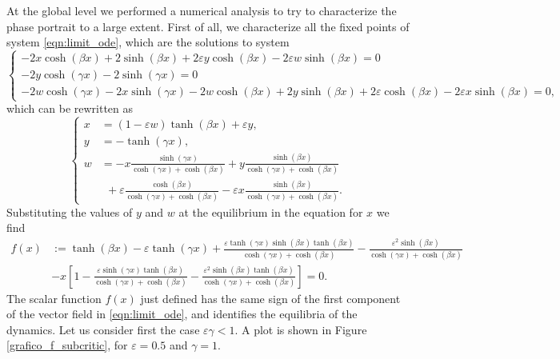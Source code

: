 \documentclass[a4paper,10pt,leqno]{amsart}
\theoremstyle{plain}
\begin{document}
At the global level we performed a numerical analysis to try to characterize the phase portrait to a large extent.
First of all, we characterize all the fixed points of system \eqref{eqn:limit_ode}, which are the solutions to system
\begin{equation}
\label{eqn:fixed_p}
\begin{cases}
- 2 x \cosh{(\beta x)} + 2 \sinh{(\beta x)} + 2\varepsilon y \cosh{(\beta x)} - 2\varepsilon w \sinh{(\beta x)} = 0 \\
-2 y \cosh{(\gamma x)} - 2\sinh{(\gamma x)} = 0\\
- 2 w \cosh{(\gamma x)} - 2 x \sinh{(\gamma x)} - 2w\cosh{(\beta x)} + 2y\sinh{(\beta x)}+ 2\varepsilon\cosh{(\beta x)} - 2\varepsilon x \sinh{(\beta x)} = 0,
\end{cases}
\end{equation}
which can be rewritten as
\begin{equation}
\label{eqn:rel}
\begin{cases}
x  &= (1-\varepsilon w)\tanh{(\beta x)} + \varepsilon y,\\
y  &= -\tanh{(\gamma x)},\\
w &= - x \frac{\sinh{(\gamma x)}}{\cosh{(\gamma x)} + \cosh{(\beta x)}} + y \frac{\sinh{(\beta x)}}{\cosh{(\gamma x)} + \cosh{(\beta x)}}\\
& \ \ + \varepsilon \frac{\cosh{(\beta x)}}{\cosh{(\gamma x)} + \cosh{(\beta x)}} - \varepsilon x \frac{\sinh{(\beta x)}}{\cosh{(\gamma x)} + \cosh{(\beta x)}}.
\end{cases}
\end{equation}
Substituting the values of $y$ and $w$ at the equilibrium in the equation for $x$ we find 
\begin{align}
\label{eqn:scalar}
f(x) & := \tanh{(\beta x)} - \varepsilon \tanh{(\gamma x)} + \frac{\varepsilon \tanh{(\gamma x)} \sinh{(\beta x)} \tanh{(\beta x)}}{\cosh{(\gamma x)} + \cosh{(\beta x)}} - \frac{\varepsilon^2 \sinh{(\beta x)}}{\cosh{(\gamma x)} + \cosh{(\beta x)}} \\
& - x\left[1 - \frac{\varepsilon \sinh{(\gamma x)}\tanh{(\beta x)}} {\cosh{(\gamma x)} + \cosh{(\beta x)}} - \frac{\varepsilon^2 \sinh{(\beta x)}\tanh{(\beta x)}}{\cosh{(\gamma x)} + \cosh{(\beta x)}}\right] = 0.\nonumber
\end{align}
The scalar function $f(x)$ just defined has the same sign of the first component of the vector field in \eqref{eqn:limit_ode}, and identifies the equilibria of the dynamics. Let us consider first the case $\varepsilon \gamma < 1$. A plot is shown in Figure \ref{grafico_f_subcritic}, for $\varepsilon =0.5$ and $\gamma = 1$. 
\end{document}
